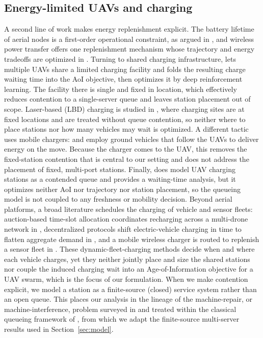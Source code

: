 \subsection{Energy-limited UAVs and charging}
A second line of work makes energy replenishment explicit. The battery lifetime
of aerial nodes is a first-order operational constraint, as argued in
\cite{galkin2019uavs}, and wireless power transfer offers one replenishment
mechanism whose trajectory and energy tradeoffs are optimized in \cite{xu2018wpt}.
Turning to shared charging infrastructure, \cite{wei2024} lets multiple UAVs
share a limited charging facility and folds the resulting charge waiting time
into the AoI objective, then optimizes it by deep reinforcement learning. The
facility there is single and fixed in location, which effectively reduces
contention to a single-server queue and leaves station placement out of scope.
Laser-based (LBD) charging is studied in \cite{sun2025laser}, where charging
sites are at fixed locations and are treated without queue contention, so
neither where to place stations nor how many vehicles may wait is optimized. A
different tactic uses mobile chargers: \cite{oubbati2024ugv} and \cite{zhao2025aoi}
employ ground vehicles that follow the UAVs to deliver energy on the move.
Because the charger comes to the UAV, this removes the fixed-station contention
that is central to our setting and does not address the placement of fixed,
multi-port stations. Finally, \cite{ev2022sharing} does model UAV charging
stations as a contended queue and provides a waiting-time analysis, but it
optimizes neither AoI nor trajectory nor station placement, so the queueing
model is not coupled to any freshness or mobility decision. Beyond aerial
platforms, a broad literature schedules the charging of vehicle and sensor
fleets: auction-based time-slot allocation coordinates recharging across a
multi-drone network in \cite{shin2019auction}, decentralized protocols shift
electric-vehicle charging in time to flatten aggregate demand in
\cite{gan2013ev}, and a mobile wireless charger is routed to replenish a sensor
fleet in \cite{xie2012immortal}. These dynamic-fleet-charging methods decide
when and where each vehicle charges, yet they neither jointly place and size the
shared stations nor couple the induced charging wait into an Age-of-Information
objective for a UAV swarm, which is the focus of our formulation. When we make
contention explicit, we model a station as a finite-source (closed) service
system rather than an open queue. This places our analysis in the lineage of the
machine-repair, or machine-interference, problem surveyed in \cite{haque2007machine}
and treated within the classical queueing framework of \cite{grossharris}, from
which we adapt the finite-source multi-server results used in Section~\ref{sec:model}.


